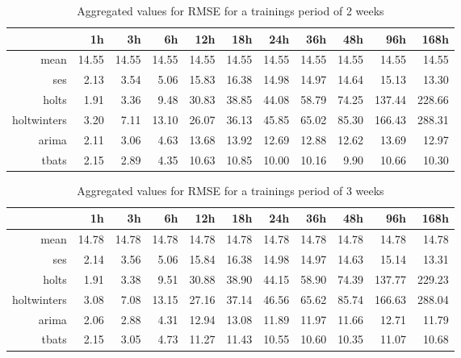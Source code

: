 \begin{table}[ht]
\centering
\begin{tabular}{rrrrrrrrrrr}
  \hline
 & 1h & 3h & 6h & 12h & 18h & 24h & 36h & 48h & 96h & 168h \\ 
  \hline
mean & 14.55 & 14.55 & 14.55 & 14.55 & 14.55 & 14.55 & 14.55 & 14.55 & 14.55 & 14.55 \\ 
  ses & 2.13 & 3.54 & 5.06 & 15.83 & 16.38 & 14.98 & 14.97 & 14.64 & 15.13 & 13.30 \\ 
  holts & 1.91 & 3.36 & 9.48 & 30.83 & 38.85 & 44.08 & 58.79 & 74.25 & 137.44 & 228.66 \\ 
  holtwinters & 3.20 & 7.11 & 13.10 & 26.07 & 36.13 & 45.85 & 65.02 & 85.30 & 166.43 & 288.31 \\ 
  arima & 2.11 & 3.06 & 4.63 & 13.68 & 13.92 & 12.69 & 12.88 & 12.62 & 13.69 & 12.97 \\ 
  tbats & 2.15 & 2.89 & 4.35 & 10.63 & 10.85 & 10.00 & 10.16 & 9.90 & 10.66 & 10.30 \\ 
   \hline
\end{tabular}
\caption{Aggregated values for RMSE for a trainings period of 2 weeks}
\end{table}
\begin{table}[ht]
\centering
\begin{tabular}{rrrrrrrrrrr}
  \hline
 & 1h & 3h & 6h & 12h & 18h & 24h & 36h & 48h & 96h & 168h \\ 
  \hline
mean & 14.78 & 14.78 & 14.78 & 14.78 & 14.78 & 14.78 & 14.78 & 14.78 & 14.78 & 14.78 \\ 
  ses & 2.14 & 3.56 & 5.06 & 15.84 & 16.38 & 14.98 & 14.97 & 14.63 & 15.14 & 13.31 \\ 
  holts & 1.91 & 3.38 & 9.51 & 30.88 & 38.90 & 44.15 & 58.90 & 74.39 & 137.77 & 229.23 \\ 
  holtwinters & 3.08 & 7.08 & 13.15 & 27.16 & 37.14 & 46.56 & 65.62 & 85.74 & 166.63 & 288.04 \\ 
  arima & 2.06 & 2.88 & 4.31 & 12.94 & 13.08 & 11.89 & 11.97 & 11.66 & 12.71 & 11.79 \\ 
  tbats & 2.15 & 3.05 & 4.73 & 11.27 & 11.43 & 10.55 & 10.60 & 10.35 & 11.07 & 10.68 \\ 
   \hline
\end{tabular}
\caption{Aggregated values for RMSE for a trainings period of 3 weeks}
\end{table}
